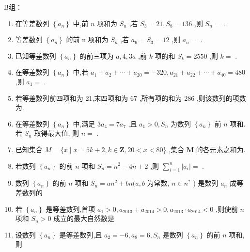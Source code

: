 B组：
\begin{enumerate}
    \item 在等差数列 $\left\{  {a}_{n}\right\}$ 中,前 $n$ 项和为 ${S}_{n}$ ,若 ${S}_{3} = {21},{S}_{8} = {136}$ ,则 ${S}_{n} =$ .
    \item 等差数列 $\left\{  {a}_{n}\right\}$ 的前 $\mathrm{n}$ 项和为 $S_{n}$ ,若 $a_6 = S_3 = {12}$ ,则 ${a}_{n} =$ .
    \item 已知等差数列 $\left\{  {a}_{n}\right\}$ 的前三项为 $a,4,{3a}$ ,前 $k$ 项的和 ${S}_{k} = {2550}$ ,则 $k =$ .
    \item 在等差数列 $\left\{  {a}_{n}\right\}$ 中,若 ${a}_{1} + {a}_{2} + \cdots  + {a}_{20} =  - {320},{a}_{21} + {a}_{22} + \cdots  + {a}_{40} = {480}$ ,则 ${a}_{1} =$ .
    \item 若等差数列前四项和为 21,末四项和为 67 ,所有项的和为 286 ,则该数列的项数为.
    \item 在等差数列 $\left\{  {a}_{n}\right\}$ 中,满足 $3{a}_{4} = 7{a}_{7}$ ,且 ${a}_{1} > 0,{S}_{n}$ 为数列 $\left\{  {a}_{n}\right\}$ 前 $n$ 项和. 若 ${S}_{n}$ 取得最大值, 则 $n =$ .
    \item 已知集合 $M = \{ x \mid  x = 5k + 2, k \in  \mathbf{Z},{20} < x < {80}\}$ ,集合 $\mathbf{M}$ 的各元素之和为.
    
    \item 若数列 $\left\{  {a}_{n}\right\}$ 的前 $n$ 项和 $S_n = n^{2} - 4n + 2$ ,则 $\mathop{\sum }\limits_{{i = 1}}^{n}\left| {a}_{i}\right|  =$ .
    
    \item 数列 $\left\{  {a}_{n}\right\}$ 的前 $n$ 项和 $S_n = a{n}^{2} + bn (a,b$ 为常数, $n \in  {n}^{ * }$ ) 是数列 $a_n$ 成等差数列的 

    \item 若 $\left\{  {a}_{n}\right\}$ 是等差数列,首项 $a_1 > 0,a_{2013} + a_{2014} > 0,a_{2013} \cdot a_{2014} < 0$ ,则使前 $n$ 项和 ${S}_{n} > 0$ 成立的最大自然数是 

    \item 设数列 $\left\{  {a}_{n}\right\}$ 是等差数列,且 ${a}_{2} =  - 6,{a}_{8} = 6,{S}_{n}$ 是数列 $\left\{  {a}_{n}\right\}$ 的前 $n$ 项和,则 


\end{enumerate}
